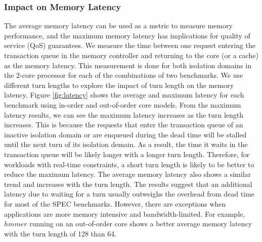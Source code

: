 \subsubsection{Impact on Memory Latency}
\label{sec:latency}

The average memory latency can be used as a metric to measure memory 
performance, and the maximum memory latency has implications for quality of 
service (QoS) guarantees. 
We measure the time between one request entering the transaction queue in the
memory controller and 
returning to the core (or a cache) as the memory latency. 
This measurement is done for both isolation domains in the 2-core 
processor for each of the combinations of two benchmarks. We use different turn lengths to explore the impact of 
turn length on the memory latency. Figure \ref{fig:latency} shows the average and maximum latency for each
benchmark using in-order and out-of-order core models. From the maximum latency results, we can see the maximum
latency increases as the turn length increases. This is because the requests that enter the transaction queue of
an inactive isolation domain or are enqueued during the dead time will be stalled until the next turn of its isolation demain.
As a result, the time it waits in the transaction queue will be likely longer with a longer turn length. Therefore, for workloads with real-time constraints,
a short turn length is likely to be better to reduce the maximum latency. The average memory latency
also shows a similar trend and increases with the turn length.
The results suggest that an additional latency due to waiting for a turn usually outweighs
the overhead from dead time for most of the SPEC benchmarks.
However, there are exceptions when applications are more memory intensive and bandwidth-limited. 
For example, $hmmer$ running on an out-of-order core shows
a better average memory
latency with the turn length of 128 than 64. 


